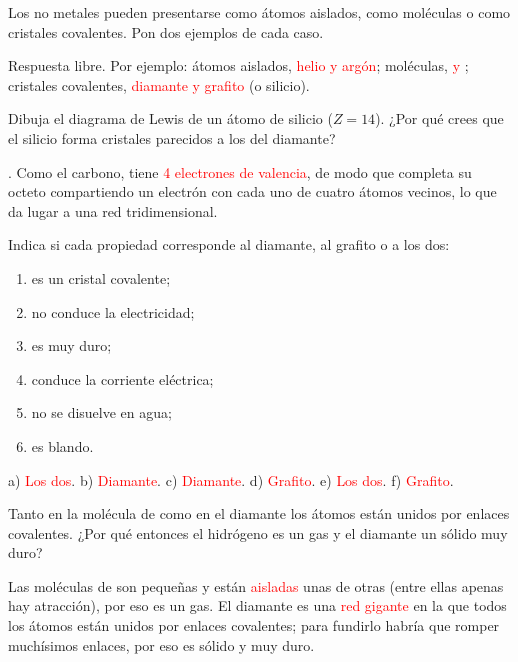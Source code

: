 \begin{exercise}
    Los no metales pueden presentarse como átomos aislados, como moléculas o como cristales covalentes. Pon dos ejemplos de cada caso.
    \begin{solu}
        Respuesta libre. Por ejemplo: átomos aislados, \textcolor{red}{helio y argón}; moléculas, \textcolor{red}{ y }; cristales covalentes, \textcolor{red}{diamante y grafito} (o silicio).
    \end{solu}
\end{exercise}

\begin{exercise}
    Dibuja el diagrama de Lewis de un átomo de silicio (\(Z = 14\)). ¿Por qué crees que el silicio forma cristales parecidos a los del diamante?
    \begin{solu}
        . Como el carbono, tiene \textcolor{red}{4 electrones de valencia}, de modo que completa su octeto compartiendo un electrón con cada uno de cuatro átomos vecinos, lo que da lugar a una red tridimensional.
    \end{solu}
\end{exercise}

\begin{exercise}
    Indica si cada propiedad corresponde al diamante, al grafito o a los dos:
    \begin{enumerate}[label=\alph*)]
        \item es un cristal covalente;
        \item no conduce la electricidad;
        \item es muy duro;
        \item conduce la corriente eléctrica;
        \item no se disuelve en agua;
        \item es blando.
    \end{enumerate}
    \begin{solu}
        a) \textcolor{red}{Los dos}. b) \textcolor{red}{Diamante}. c) \textcolor{red}{Diamante}. d) \textcolor{red}{Grafito}. e) \textcolor{red}{Los dos}. f) \textcolor{red}{Grafito}.
    \end{solu}
\end{exercise}

\begin{exercise}
    Tanto en la molécula de  como en el diamante los átomos están unidos por enlaces covalentes. ¿Por qué entonces el hidrógeno es un gas y el diamante un sólido muy duro?
    \begin{solu}
        Las moléculas de  son pequeñas y están \textcolor{red}{aisladas} unas de otras (entre ellas apenas hay atracción), por eso es un gas. El diamante es una \textcolor{red}{red gigante} en la que todos los átomos están unidos por enlaces covalentes; para fundirlo habría que romper muchísimos enlaces, por eso es sólido y muy duro.
    \end{solu}
\end{exercise}


